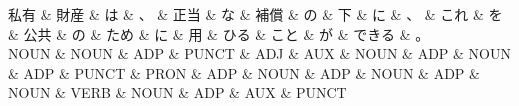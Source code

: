 \documentclass[tikz,border=5pt]{standalone}
\begin{document}
\normalsize
\begin{dependency}[edge unit distance=12.0pt]
    \begin{deptext}[column sep=1em]
        私有 \& 財産 \& は \& 、 \& 正当 \& な \& 補償 \& の \& 下 \& に \& 、 \& これ \& を \& 公共 \& の \& ため \& に \& 用 \& ひる \& こと \& が \& できる \& 。\\
        NOUN \& NOUN \& ADP \& PUNCT \& ADJ \& AUX \& NOUN \& ADP \& NOUN \& ADP \& PUNCT \& PRON \& ADP \& NOUN \& ADP \& NOUN \& ADP \& NOUN \& VERB \& NOUN \& ADP \& AUX \& PUNCT\\
    \end{deptext}
\end{dependency}
\end{document}
